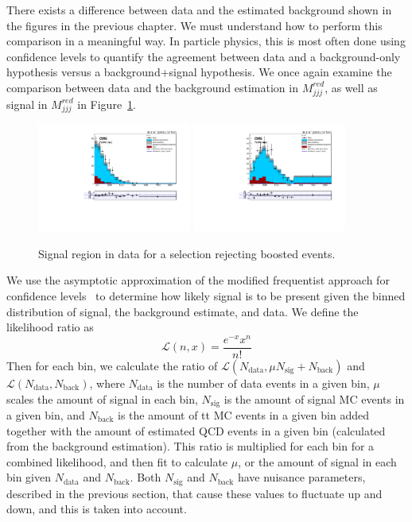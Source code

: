 There exists a difference between data and the estimated background shown in the figures in the previous chapter. We must understand how to perform this comparison in a meaningful way. In particle physics, this is most often done using confidence levels to quantify the agreement between data and a background-only hypothesis versus a background+signal hypothesis. 
We once again examine the comparison between data and the background estimation in $M_{jjj}^{red}$, as well as signal in $M_{jjj}^{red}$ in Figure~\ref{fig:databoost2}.
\begin{figure}[h]
\centering
\includegraphics[width=0.45\textwidth]{F5/HH4b2p1_Plot_NRv1_unB1_boost_dEta1.pdf}
\includegraphics[width=0.45\textwidth]{F5/HH4b2p1_Plot_NRv1_unB1_boost_dEta2.pdf}
\caption{Signal region in data for a selection rejecting boosted events.}
\label{fig:databoost2}
\end{figure}
We use the asymptotic approximation of the modified frequentist approach for confidence levels~\cite{Junk:1999kv, Read:2002hq, Conway:1333496} to determine how likely signal is to be present given the binned distribution of signal, the background estimate, and data. We define the likelihood ratio as
\begin{equation}
\mathcal{L}(n,x) = \frac{e^{-x}x^{n}}{n!}
\end{equation}
Then for each bin, we calculate the ratio of $\mathcal{L}(N_{\text{data}}, \mu N_{\text{sig}} + N_{\text{back}})$ and  $\mathcal{L}(N_{\text{data}}, N_{\text{back}})$, where $N_{\text{data}}$ is the number of data events in a given bin, $\mu$ scales the amount of signal in each bin, $N_{\text{sig}}$ is the amount of signal MC events in a given bin, and $N_{\text{back}}$ is the amount of tt MC events in a given bin added together with the amount of estimated QCD events in a given bin (calculated from the background estimation). This ratio is multiplied for each bin for a combined likelihood, and then fit to calculate $\mu$, or the amount of signal in each bin given $N_{\text{data}}$ and $N_{\text{back}}$. Both $N_{\text{sig}}$ and $N_{\text{back}}$ have nuisance parameters, described in the previous section, that cause these values to fluctuate up and down, and this is taken into account. 

